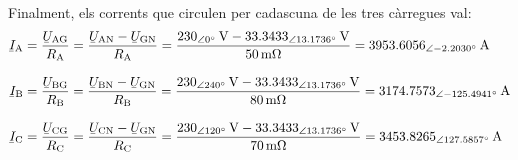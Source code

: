 \begin{exemple}
    Finalment, els corrents que circulen per cadascuna de les tres càrregues val:
    \begin{align*}
    \cmplx{I}\ped{A} &= \frac{\cmplx{U}\ped{AG}}{R\ped{A}} = \frac{\cmplx{U}\ped{AN} - \cmplx{U}\ped{GN}}{R\ped{A}} = \frac{\qtypd{230}{0}{V}-\qtypd{33,3433}{13,1736}{V}}{\qty{50}{m\ohm}}
    = \qtypd{3953,6056}{-2,2030}{A}\\[2ex]
    \cmplx{I}\ped{B} &= \frac{\cmplx{U}\ped{BG}}{R\ped{B}} = \frac{\cmplx{U}\ped{BN} - \cmplx{U}\ped{GN}}{R\ped{B}} = \frac{\qtypd{230}{240}{V}-\qtypd{33,3433}{13,1736}{V}}{\qty{80}{m\ohm}}
    = \qtypd{3174,7573}{-125,4941}{A}\\[2ex]
    \cmplx{I}\ped{C} &= \frac{\cmplx{U}\ped{CG}}{R\ped{C}} = \frac{\cmplx{U}\ped{CN} - \cmplx{U}\ped{GN}}{R\ped{C}} = \frac{\qtypd{230}{120}{V}-\qtypd{33,3433}{13,1736}{V}}{\qty{70}{m\ohm}}
    = \qtypd{3453,8265}{127,5857}{A}
    \end{align*}
\end{exemple}

